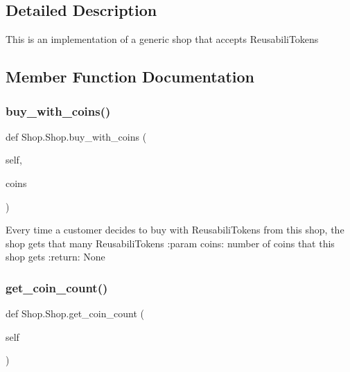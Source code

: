 \subsection{Detailed Description}
\begin{DoxyVerb}This is an implementation of a generic shop that accepts ReusabiliTokens
\end{DoxyVerb}
 

\subsection{Member Function Documentation}
\mbox{\label{class_shop_1_1_shop_af62739edeb16dfc57c23c5a4ff1a54e9}} 
\subsubsection{\texorpdfstring{buy\+\_\+with\+\_\+coins()}{buy\_with\_coins()}}
{\footnotesize\ttfamily def Shop.\+Shop.\+buy\+\_\+with\+\_\+coins (\begin{DoxyParamCaption}\item[{}]{self,  }\item[{}]{coins }\end{DoxyParamCaption})}

\begin{DoxyVerb}Every time a customer decides to buy with ReusabiliTokens from this shop, the shop
gets that many ReusabiliTokens
:param coins: number of coins that this shop gets
:return: None
\end{DoxyVerb}
 \mbox{\label{class_shop_1_1_shop_aa57249095c0d73dcc3bf6223ec15c0ad}} 
\subsubsection{\texorpdfstring{get\+\_\+coin\+\_\+count()}{get\_coin\_count()}}
{\footnotesize\ttfamily def Shop.\+Shop.\+get\+\_\+coin\+\_\+count (\begin{DoxyParamCaption}\item[{}]{self }\end{DoxyParamCaption})}


